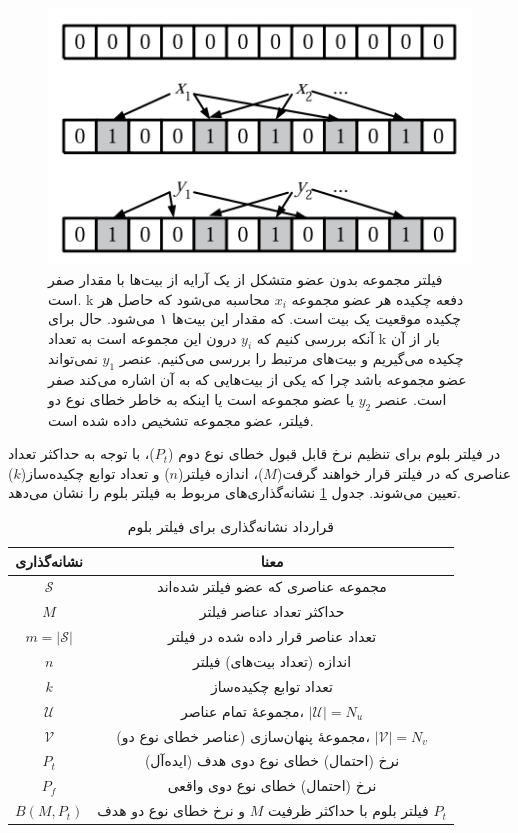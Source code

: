 \begin{figure}
	\centering
	\includegraphics[width=0.55\linewidth]{image/BloomFilter}
	\caption[نمونه‌ای از عمکلرد فیلتر بلوم]{
		فیلتر مجموعه بدون عضو متشکل از یک آرایه‌ از بیت‌ها با مقدار صفر است. k دفعه چکیده هر عضو مجموعه $x_i$ محاسبه می‌شود که حاصل هر چکیده موقعیت یک بیت است. که مقدار این بیت‌ها ۱ می‌شود. حال برای آنکه بررسی کنیم که $y_i$ درون این مجموعه است به تعداد k بار از آن چکیده می‌گیریم و بیت‌های مرتبط را بررسی می‌کنیم. عنصر $y_1$ نمی‌تواند عضو مجموعه باشد چرا که یکی از بیت‌هایی که به آن اشاره می‌کند صفر است. عنصر $y_2$ یا عضو مجموعه است یا اینکه به خاطر خطای نوع دو فیلتر، عضو مجموعه تشخیص داده شده است.\cite{Broder2004}
	}
	\label{fig:bloomfilter}
\end{figure}

در فیلتر بلوم برای تنظیم نرخ قابل قبول خطای نوع دوم ($P_t$)، با توجه به حداکثر تعداد عناصری که در فیلتر قرار خواهند گرفت($M$)، اندازه فیلتر($n$) و تعداد توابع‌ چکیده‌ساز($k$) تعیین می‌شوند.
جدول \ref{table:BloomFilter} نشانه‌گذاری‌های مربوط به فیلتر بلوم را نشان می‌دهد.

\begin{table}[h]
	\centering
	\caption{قرارداد نشانه‌گذاری برای فیلتر بلوم}
	\label{table:BloomFilter}
	\begin{tabular}{|c|c|}
		\hline
		نشانه‌گذاری & معنا \\
		\hline
		\hline
		$\mathcal{S}$ & مجموعه عناصری که عضو فیلتر شده‌اند \\
		\hline
		$M$ & حداکثر تعداد عناصر فیلتر\\
		\hline
		$m = |\mathcal{S}|$ & تعداد عناصر قرار داده شده در فیلتر\\
		\hline
		$n$ & اندازه (تعداد بیت‌های) فیلتر \\
		\hline
		$k$ & تعداد توابع چکیده‌ساز\\
		\hline
		$\mathcal{U}$ & مجموعهٔ تمام عناصر، $|\mathcal{U}| = N_u$ \\
		\hline
		$\mathcal{V}$ & مجموعهٔ پنهان‌سازی (عناصر خطای نوع دو)، $|\mathcal{V}| = N_v$\\
		\hline
		$P_t$ & نرخ (احتمال) خطای نوع دوی هدف (ایده‌آل)\\
		\hline
		$P_f$ & نرخ (احتمال) خطای نوع دوی واقعی \\
		\hline
		$B(M, P_t)$ & فیلتر بلوم با حداکثر ظرفیت $M$ و نرخ خطای نوع دو هدف $P_t$ \\
		\hline
	\end{tabular}
\end{table}

